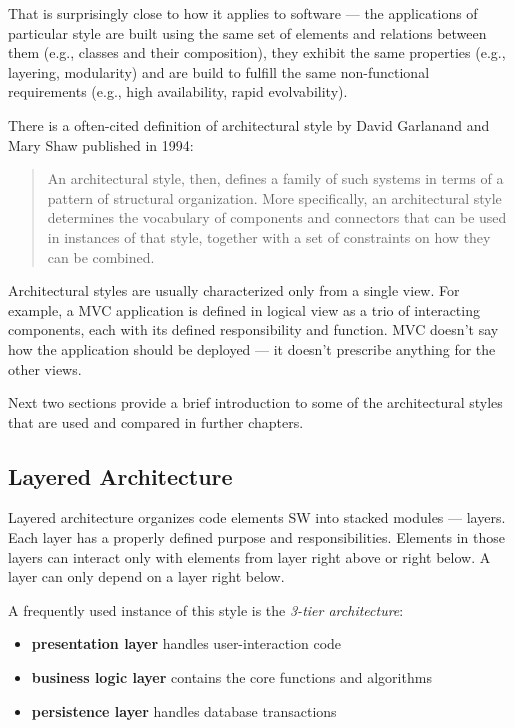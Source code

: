 \documentclass[thesis=M,english,hidelinks]{FITthesis}[2012/10/20]
\begin{document}
That is surprisingly close to how it applies to software --- the applications of particular style are built using the same set of elements and relations between them (e.g., classes and their composition), they exhibit the same properties (e.g., layering, modularity) and are build to fulfill the same non-functional requirements (e.g., high availability, rapid evolvability).

There is a often-cited definition of architectural style by David Garlanand and Mary Shaw published in 1994:
\begin{quote}
An architectural style, then, defines a family of such systems in terms of a pattern of structural organization. More specifically, an architectural style determines the vocabulary of components and connectors that can be used in instances of that style, together with a set of constraints on how they can be combined.~\cite{sa-intro-garlan-shaw}
\end{quote}

Architectural styles are usually characterized only from a single view. For example, a \acrfull{MVC} application is defined in logical view as a trio of interacting components, each with its defined responsibility and function. \acrshort{MVC} doesn't say how the application should be deployed --- it doesn't prescribe anything for the other views. 

Next two sections provide a brief introduction to some of the architectural styles that are used and compared in further chapters.

\subsection{Layered Architecture}
Layered architecture organizes code elements \acrshort{SW} into stacked modules --- layers. Each layer has a properly defined purpose and responsibilities. Elements in those layers can interact only with elements from layer right above or right below. A layer can only depend on a layer right below.

A frequently used instance of this style is the \textit{3-tier architecture}:
\begin{itemize}
    \item \textbf{presentation layer} handles user-interaction code
    \item \textbf{business logic layer} contains the core functions and algorithms
    \item \textbf{persistence layer} handles database transactions
\end{itemize}
\end{document}
